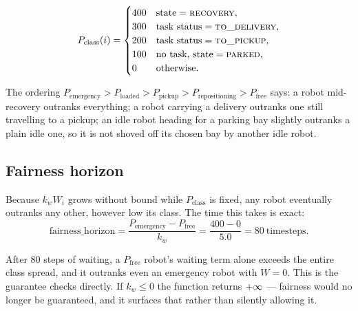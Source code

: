 \begin{equation}
  P_{\mathrm{class}}(i) =
  \begin{cases}
    400 & \text{state} = \textsc{recovery},\\
    300 & \text{task status} = \textsc{to\_delivery},\\
    200 & \text{task status} = \textsc{to\_pickup},\\
    100 & \text{no task, state} = \textsc{parked},\\
    0 & \text{otherwise.}
  \end{cases}
\end{equation}

The ordering $P_{\mathrm{emergency}} > P_{\mathrm{loaded}} >
P_{\mathrm{pickup}} > P_{\mathrm{repositioning}} > P_{\mathrm{free}}$ says: a
robot mid-recovery outranks everything; a robot carrying a delivery outranks
one still travelling to a pickup; an idle robot heading for a parking bay
slightly outranks a plain idle one, so it is not shoved off its chosen bay by
another idle robot.

\subsection{Fairness horizon}
\label{sec:priority-fairness}

Because $k_w W_i$ grows without bound while $P_{\mathrm{class}}$ is fixed, any
robot eventually outranks any other, however low its class. The time this takes
is exact:
\begin{equation}
  \mathrm{fairness\_horizon}
    = \frac{P_{\mathrm{emergency}} - P_{\mathrm{free}}}{k_w}
    = \frac{400 - 0}{5.0} = 80 \ \text{timesteps.}
  \label{eq:fairness-horizon}
\end{equation}

After 80 steps of waiting, a $P_{\mathrm{free}}$ robot's waiting term alone
exceeds the entire class spread, and it outranks even an emergency robot with
$W = 0$. This is the guarantee  checks directly. If
$k_w \leq 0$ the function returns $+\infty$ --- fairness would no longer be
guaranteed, and it surfaces that rather than silently allowing it.

